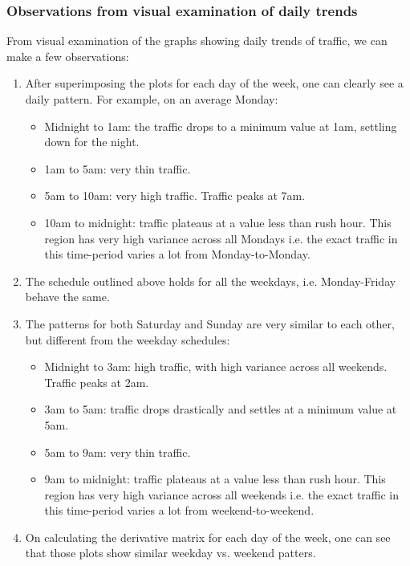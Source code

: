 \documentclass[10pt,a4paper]{amsart}
\begin{document}
\subsubsection{Observations from visual examination of daily trends}
From visual examination of the graphs showing daily trends of traffic, we can
make a few observations:
\begin{enumerate}
	\item After superimposing the plots for each day of the week, one can
		clearly see a daily pattern. For example, on an average Monday:
		\begin{itemize}
	        \item Midnight  to 1am: the traffic drops to a minimum value at
	        		1am, settling down for the night.
        		\item 1am to 5am: very thin traffic.
        		\item 5am to 10am: very high traffic. Traffic peaks at 7am.
        		\item 10am to midnight: traffic plateaus at a value less than
        			rush hour. This region has very high variance across all
        			Mondays i.e. the exact traffic in this time-period varies a
        			lot from Monday-to-Monday.
        	\end{itemize}
    \item The schedule outlined above holds for all the weekdays, i.e.
    		Monday-Friday behave the same.
    \item The patterns for both Saturday and Sunday are very similar to
    		each other, but different from the weekday schedules:
        \begin{itemize}
	        \item Midnight to 3am: high traffic, with high variance across
	        		all weekends. Traffic peaks at 2am.
        		\item 3am to 5am: traffic drops drastically and settles at a
        			minimum value at 5am.
        		\item 5am to 9am: very thin traffic.
        		\item 9am to midnight: traffic plateaus at a value less than
        			rush hour. This region has very high variance across all
        			weekends i.e. the exact traffic in this time-period varies
        			a lot from weekend-to-weekend.
        	\end{itemize}
    	\item On calculating the derivative matrix for each day of the week,
    	one
    		can see that those plots show similar weekday vs. weekend patters.

\end{enumerate}
\end{document}
